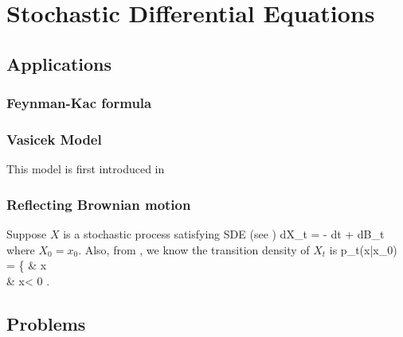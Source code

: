 \chapter{Stochastic Differential Equations}



\section{Applications}

\subsection{Feynman-Kac formula}

\subsection{Vasicek Model}

This model is first introduced in \cite{Vasicek_1977}

\subsection{Reflecting Brownian motion}

Suppose $X$ is a stochastic process satisfying SDE (see \cite{Graversen_Shiryaev_2000})
\be
dX_t = -\lm \sgn {} dt + dB_t
\ee
where $X_0 = x_0$. Also, from \cite{Karatzas_Shreve_1991}, we know the transition density of $X_t$ is
\be
p_t(x|x_0) = \left\{  & x \\
 \quad \quad & x< 0
\ea\right.
\ee


\section{Problems}



